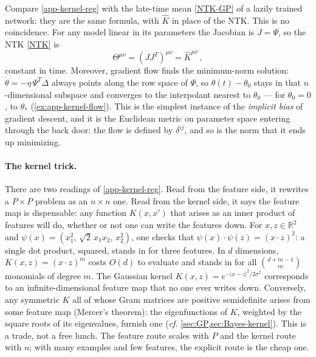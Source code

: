 \documentclass[11pt]{article}
\newcommand{\R}{\mathbb{R}}
\begin{document}
Compare \eqref{app-kernel-reg} with the late-time mean \eqref{NTK-GP} of a lazily trained network: they are the same formula, with $\hat K$ in place of the NTK. This is no coincidence. For any model linear in its parameters the Jacobian is $J=\Psi$, so the NTK \eqref{NTK} is
%
\begin{equation}
    \Theta^{\mu\nu} = (JJ^T)^{\mu\nu} = \hat K^{\mu\nu}\,, \label{app-NTK-is-K}
\end{equation}
%
constant in time. Moreover, gradient flow finds the minimum-norm solution: $\dot\theta = -\eta\,\Psi^T\Delta$ always points along the row space of $\Psi$, so $\theta(t)-\theta_0$ stays in that $n$-dimensional subspace and converges to the interpolant nearest to $\theta_0$ --- for $\theta_0 = 0$, to $\theta_*$ (\cref{ex:app-kernel-flow}). This is the simplest instance of the \emph{implicit bias} of gradient descent, and it is the Euclidean metric on parameter space entering through the back door: the flow is defined by $\delta^{ij}$, and so is the norm that it ends up minimizing.

\paragraph{The kernel trick.} There are two readings of \eqref{app-kernel-reg}. Read from the feature side, it rewrites a $P\times P$ problem as an $n\times n$ one. Read from the kernel side, it says the feature map is dispensable: any function $K(x,x')$ that arises as an inner product of features will do, whether or not one can write the features down. For $x,z\in\R^2$ and $\psi(x) = (x_1^2,\,\sqrt2\,x_1x_2,\,x_2^2)$, one checks that $\psi(x)\cdot\psi(z) = (x\cdot z)^2$: a single dot product, squared, stands in for three features. In $d$ dimensions, $K(x,z) = (x\cdot z)^m$ costs $O(d)$ to evaluate and stands in for all $\binom{d+m-1}{m}$ monomials of degree $m$. The Gaussian kernel $K(x,z) = e^{-|x-z|^2/2\sigma^2}$ corresponds to an infinite-dimensional feature map that no one ever writes down. Conversely, any symmetric $K$ all of whose Gram matrices are positive semidefinite arises from some feature map (Mercer's theorem): the eigenfunctions of $K$, weighted by the square roots of its eigenvalues, furnish one (\emph{cf.} \cref{sec:GP,sec:Bayes-kernel}). This is a trade, not a free lunch. The feature route scales with $P$ and the kernel route with $n$; with many examples and few features, the explicit route is the cheap one.
\end{document}
